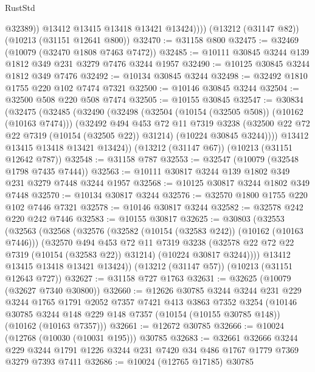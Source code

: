 \begin{lexlean}{RustStd}
\begin{coremodule}
{\begin{coremodule}
{{{{{{{{{{{{{{{{{{{{{{{{{{                @32389))
            @13412
            @13415
            @13418
            @13421
            @13424))))
    (@13212 (@31147 @82))
    (@10213 (@31151 @12641 @800))
@32470 := @31158 @800
@32475 := @32469 (@10079 (@32470 @1808 @7463 @7472))
@32485 := @10111 @30845 @3244 @139 @1812 @349 @231 @3279 @7476 @3244 @1957
@32490 := @10125 @30845 @3244 @1812 @349 @7476
@32492 := @10134 @30845 @3244
@32498 := @32492 @1810 @1755 @220 @102 @7474 @7321
@32500 := @10146 @30845 @3244
@32504 := @32500 @508 @220 @508 @7474
@32505 := @10155 @30845
@32547 := @30834
    (@32475
      (@32485
        (@32490
          (@32498
            (@32504 (@10154 (@32505 @508)) (@10162 (@10163 @7474)))
            (@32492
              @494
              @453
              @72
              @11
              @7319
              @3238
              (@32500 @22 @72 @22 @7319 (@10154 (@32505 @22)) @31214)
              (@10224 @30845 @3244))))
        @13412
        @13415
        @13418
        @13421
        @13424))
    (@13212 (@31147 @67))
    (@10213 (@31151 @12642 @787))
@32548 := @31158 @787
@32553 := @32547 (@10079 (@32548 @1798 @7435 @7444))
@32563 := @10111 @30817 @3244 @139 @1802 @349 @231 @3279 @7448 @3244 @1957
@32568 := @10125 @30817 @3244 @1802 @349 @7448
@32570 := @10134 @30817 @3244
@32576 := @32570 @1800 @1755 @220 @102 @7446 @7321
@32578 := @10146 @30817 @3244
@32582 := @32578 @242 @220 @242 @7446
@32583 := @10155 @30817
@32625 := @30803
    (@32553
      (@32563
        (@32568
          (@32576
            (@32582 (@10154 (@32583 @242)) (@10162 (@10163 @7446)))
            (@32570
              @494
              @453
              @72
              @11
              @7319
              @3238
              (@32578 @22 @72 @22 @7319 (@10154 (@32583 @22)) @31214)
              (@10224 @30817 @3244))))
        @13412
        @13415
        @13418
        @13421
        @13424))
    (@13212 (@31147 @57))
    (@10213 (@31151 @12643 @727))
@32627 := @31158 @727 @1763
@32631 := @32625 (@10079 (@32627 @7340 @30800))
@32660 := @12626
    @30785
    @3244
    @3244
    @231
    @229
    @3244
    @1765
    @1791
    @2052
    @7357
    @7421
    @413
    @3863
    @7352
    @3254
    (@10146 @30785 @3244 @148 @229 @148 @7357 (@10154 (@10155 @30785 @148)) (@10162 (@10163 @7357)))
@32661 := @12672 @30785
@32666 := @10024 (@12768 (@10030 (@10031 @195))) @30785
@32683 := @32661
    @32666
    @3244
    @229
    @3244
    @1791
    @1226
    @3244
    @231
    @7420
    @34
    @486
    @1767
    @1779
    @7369
    @3279
    @7393
    @7411
@32686 := @10024 (@12765 @17185) @30785
}}}}}}}}}}}}}}}}}}}}}}}}}}
\end{coremodule}}
\end{coremodule}
\end{lexlean}
